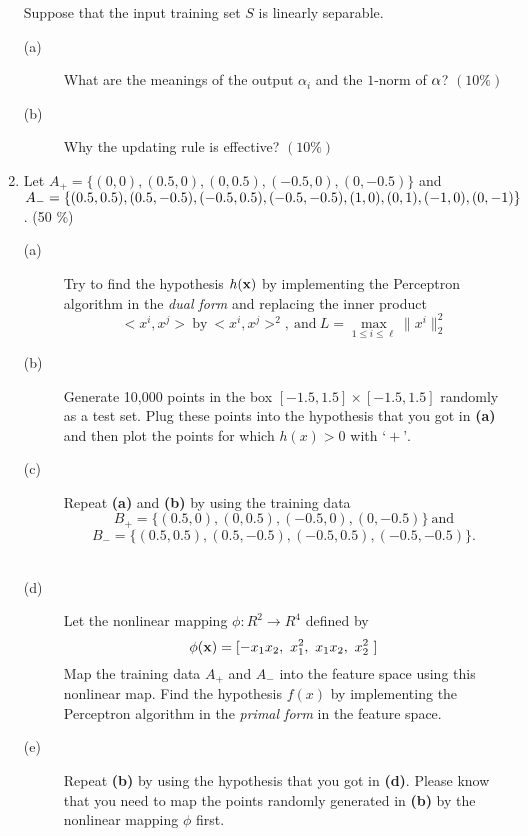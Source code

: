 \documentclass[12pt]{article}
\begin{document}
\begin{enumerate}
Suppose that the input training set $S$ is linearly separable.
\begin{description}
\item [(a)] What are the meanings of the output $\alpha_i$ and the $1$-norm of
${\bf \alpha}$? $(10 \%)$
\item[(b)] Why the updating rule is effective? $(10 \%)$
\end{description}
\newpage
\item Let $A_ + =\{(0, 0), (0.5, 0), (0, 0.5), (-0.5, 0), (0,-0.5)\}$ and \\ $A_{-}=\{(0.5, 0.5), (0.5,
-0.5), (-0.5, 0.5), (-0.5,-0.5), (1, 0),\\ (0, 1), (-1, 0),(0,-1)\}$. (50 \%)\ \\
\begin{description}
\item[(a)] Try to find the hypothesis $h({\bf x})$ by implementing the Perceptron algorithm in the {\em dual form} and replacing the inner product \[<x^i, x^j> ~ \mbox{by} ~ <x^i, x^j>^2, ~ \mbox{and} ~ L=\max_{1 \le i \le \ell} \|x^i \|_2^2\] 
\item[(b)] Generate 10,000 points in the box $[-1.5, 1.5] \times [-1.5, 1.5]$ randomly as a test set. Plug these points into the hypothesis that you got in {\bf (a)} and then plot the points for which $h(x) > 0$ with $‘+’$.
\ \\
\item[(c)] Repeat {\bf (a)} and {\bf (b)} by using the training data \[B_ + =\{(0.5, 0), (0, 0.5), (-0.5, 0), (0,-0.5)\} ~\mbox{and}\] \[B_{-}=\{(0.5, 0.5), (0.5,
-0.5), (-0.5, 0.5), (-0.5,-0.5)\}.\] \\
\item[(d)] Let the nonlinear mapping $\phi : R^2 \rightarrow R^4$ defined by
\[ \phi({\bf x})= [-x_1x_2,~  x_1^2,~  x_1x_2,~  x_2^2~] \]
Map the training data $A_+$ and $A_-$ into the feature space using
this nonlinear map. Find the hypothesis $f(x)$ by implementing the Perceptron algorithm in the {\em primal form} in the feature space.\ \\
\item[(e)] Repeat {\bf (b)} by using the hypothesis that you got in {\bf (d)}. Please
know that you need to map the points randomly generated in {\bf (b)}
by the nonlinear mapping $\phi$ first.


\end{description}
\end{enumerate}
\end{document}
